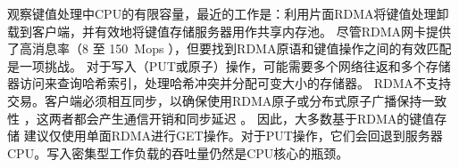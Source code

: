 观察键值处理中CPU的有限容量，最近的工作是：利用片面RDMA将键值处理卸载到客户端，并有效地将键值存储服务器用作共享内存池。
尽管RDMA网卡提供了高消息率（8 至 150~Mops \cite {kalia2016design}），但要找到RDMA原语和键值操作之间的有效匹配是一项挑战。
对于写入（PUT或原子）操作，可能需要多个网络往返和多个存储器访问来查询哈希索引，处理哈希冲突并分配可变大小的存储器。
RDMA不支持交易。客户端必须相互同步，以确保使用RDMA原子或分布式原子广播保持一致性 \cite{szepesi2014designing}，这两者都会产生通信开销和同步延迟 \cite {mitchell2013using,dragojevic2014farm}。
因此，大多数基于RDMA的键值存储 \cite {mitchell2013using,dragojevic2014farm,kalia2014using}建议仅使用单面RDMA进行GET操作。对于PUT操作，它们会回退到服务器CPU。写入密集型工作负载的吞吐量仍然是CPU核心的瓶颈。

\iffalse
\subsection{FPGA 可编程网卡}
\label{kvdirect:sec:programmable-nic}

十年前，处理器频率扩展速度放慢，人们转向多核和并发\cite {sutter2005free}。
如今，功率上限意味着多核扩展也遇到了困难\cite {esmaeilzadeh2013power}。
人们现在转向领域定制架构（DSA）以获得更好的性能。


由于网络速度和CPU网络处理能力的不匹配日益增加，带有FPGA的可编程网卡 \cite {vfp,greenberg2015sdn,li2016clicknp,caulfield2016cloud} 现在可以在数据中心进行大规模部署。
本文使用的可编程网卡的核心是FPGA，带有嵌入式网卡芯片以连接到网络。
可编程网卡通常带有板载DRAM作为数据包缓冲区和用于网卡固件的运行时内存\cite {li2016clicknp}，但DRAM通常不足以容纳整个键值存储。
\fi

